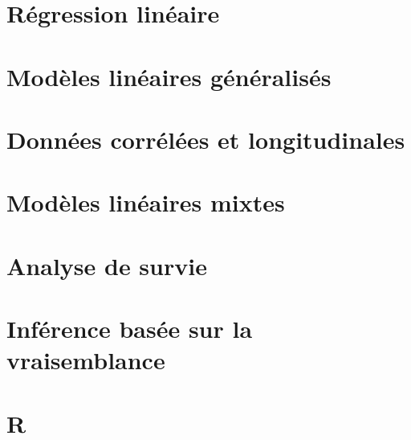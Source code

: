 \documentclass[
  11pt,
  letterpaper,
]{book}
\begin{document}
\hypertarget{regression-lineaire}{%
\chapter{Régression linéaire}\label{regression-lineaire}}

\hypertarget{modeles-lineaires-generalises}{%
\chapter{Modèles linéaires généralisés}\label{modeles-lineaires-generalises}}

\hypertarget{donnees-correlees-longitudinales}{%
\chapter{Données corrélées et longitudinales}\label{donnees-correlees-longitudinales}}

\hypertarget{modeles-lineaires-mixtes}{%
\chapter{Modèles linéaires mixtes}\label{modeles-lineaires-mixtes}}

\hypertarget{survie}{%
\chapter{Analyse de survie}\label{survie}}

\hypertarget{vraisemblance}{%
\chapter{Inférence basée sur la vraisemblance}\label{vraisemblance}}

\hypertarget{appendix-annexe}{%
\appendix}


\hypertarget{r}{%
\chapter*{\texorpdfstring{\textbf{R}}{R}}\label{r}}

  
\end{document}
